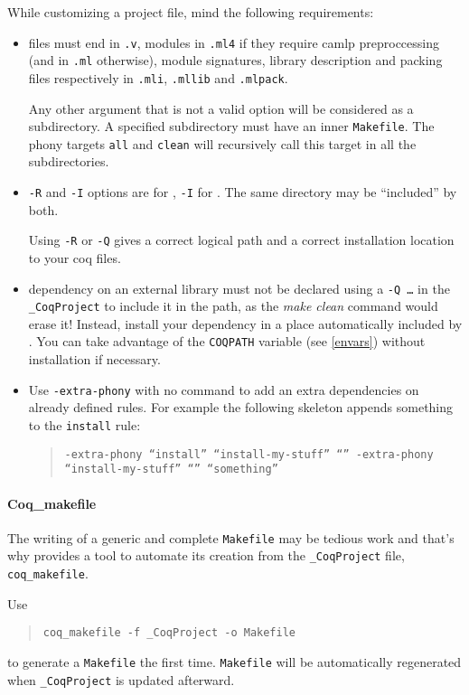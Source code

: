 While customizing a project file, mind the following requirements:
\begin{itemize}
\item {\Coq} files must end in \texttt{.v}, {\ocaml} modules in
  \texttt{.ml4} if they require camlp preproccessing (and in
  \texttt{.ml} otherwise), {\ocaml} module signatures, library
  description and packing files respectively in \texttt{.mli},
  \texttt{.mllib} and \texttt{.mlpack}.

Any other argument that is not a valid option will be considered as a
subdirectory. A specified subdirectory must have an inner
\texttt{Makefile}. The phony targets \texttt{all} and \texttt{clean}
will recursively call this target in all the subdirectories.

\item \texttt{-R} and \texttt{-I} options are for {\Coq}, \texttt{-I}
  for {\ocaml}. The same directory may be ``included'' by both.

  Using \texttt{-R} or \texttt{-Q} gives a correct logical path
  and a correct installation location to your coq files.
\item dependency on an external library must not be declared using a
  \texttt{-Q \dots} in the \texttt{\_CoqProject} to include it in the
  path, as the \textit{make clean} command would erase it! Instead,
  install your dependency in a place automatically included by
  {\Coq}. You can take advantage of the \texttt{COQPATH} variable
  (see \ref{envars}) without installation if necessary.
\item Use \texttt{-extra-phony} with no command to add an extra
  dependencies on already defined rules. For example the following
  skeleton appends something to the \texttt{install} rule:
\begin{quotation}
\texttt{-extra-phony ``install'' ``install-my-stuff'' ``''
  -extra-phony ``install-my-stuff'' ``'' ``something''}
\end{quotation}
\end{itemize}

\paragraph{Coq\_makefile}
The writing of a generic and complete \texttt{Makefile} may be tedious
work and that's why {\Coq} provides a tool to automate its creation
from the \texttt{\_CoqProject} file, \texttt{coq\_makefile}.

Use
\begin{quotation}
\texttt{coq\_makefile -f \_CoqProject -o Makefile}
\end{quotation}
to generate a \texttt{Makefile} the first time. \texttt{Makefile} will be
automatically regenerated when \texttt{\_CoqProject} is updated afterward.

